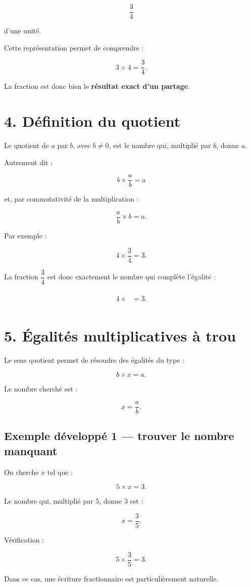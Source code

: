 \[
\dfrac{3}{4}
\]

d’une unité.

Cette représentation permet de comprendre :

\[
3\div4=\dfrac{3}{4}.
\]

La fraction est donc bien le \textbf{résultat exact d’un partage}.

\section{4. Définition du quotient}

Le quotient de $a$ par $b$, avec $b\neq0$, est le nombre qui, multiplié par $b$, donne $a$.

Autrement dit :

\[
\boxed{
b\times\dfrac{a}{b}=a
}
\]

et, par commutativité de la multiplication :

\[
\boxed{
\dfrac{a}{b}\times b=a
}.
\]

Par exemple :

\[
4\times\dfrac{3}{4}=3.
\]

La fraction $\dfrac{3}{4}$ est donc exactement le nombre qui complète l’égalité :

\[
4\times\boxed{\phantom{\dfrac{3}{4}}}=3.
\]

\section{5. Égalités multiplicatives à trou}

Le sens quotient permet de résoudre des égalités du type :

\[
b\times x=a.
\]

Le nombre cherché est :

\[
x=\dfrac{a}{b}.
\]

\subsection{Exemple développé 1 — trouver le nombre manquant}

On cherche $x$ tel que :

\[
5\times x=3.
\]

Le nombre qui, multiplié par $5$, donne $3$ est :

\[
x=\dfrac{3}{5}.
\]

Vérification :

\[
5\times\dfrac{3}{5}=3.
\]

Dans ce cas, une écriture fractionnaire est particulièrement naturelle.

